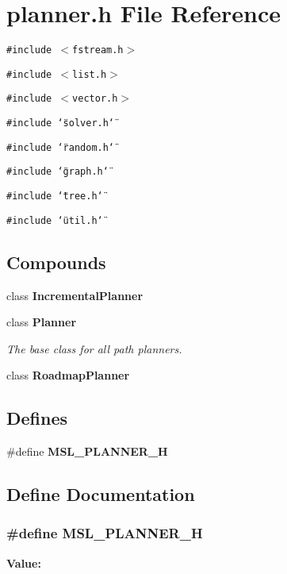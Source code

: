 \section{planner.h File Reference}
\label{planner_8h}
{\tt \#include $<$fstream.h$>$}\par
{\tt \#include $<$list.h$>$}\par
{\tt \#include $<$vector.h$>$}\par
{\tt \#include \char`\"{}solver.h\char`\"{}}\par
{\tt \#include \char`\"{}random.h\char`\"{}}\par
{\tt \#include \char`\"{}graph.h\char`\"{}}\par
{\tt \#include \char`\"{}tree.h\char`\"{}}\par
{\tt \#include \char`\"{}util.h\char`\"{}}\par
\subsection*{Compounds}
\begin{CompactItemize}
\item 
class {\bf Incremental\-Planner}
\item 
class {\bf Planner}
\begin{CompactList}\small\item\em The base class for all path planners.\item\end{CompactList}\item 
class {\bf Roadmap\-Planner}
\end{CompactItemize}
\subsection*{Defines}
\begin{CompactItemize}
\item 
\#define {\bf MSL\_\-PLANNER\_\-H}
\end{CompactItemize}


\subsection{Define Documentation}
\subsubsection{\setlength{\rightskip}{0pt plus 5cm}\#define MSL\_\-PLANNER\_\-H}\label{planner_8h_a0}


{\bf Value:}\footnotesize\begin{verbatim}
\end{verbatim}\normalsize 
